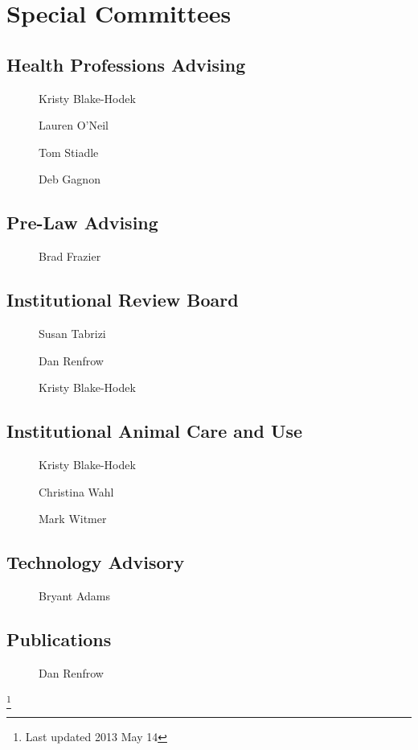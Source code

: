\documentclass[10pt, twocolumn]{amsart}
\newcommand{\noteQualification}[1]{}
\begin{document}
\section*{Special Committees}
\subsection*{Health Professions Advising} 
\begin{description}
\item[] Kristy Blake-Hodek
\item[] Lauren O'Neil
\item[] Tom Stiadle
\item[] Deb Gagnon
\end{description}

\subsection*{Pre-Law Advising} 
\begin{description}
\item[] Brad Frazier
\end{description}

\subsection*{Institutional Review Board} 
\begin{description}
\item[] Susan Tabrizi
\item[] Dan Renfrow
\item[] Kristy Blake-Hodek
\end{description}

\subsection*{Institutional Animal Care and Use} 
\begin{description}
\item[] Kristy Blake-Hodek \noteQualification{vertebrate animal care and responsibility certification}
\item[] Christina Wahl
\item[] Mark Witmer
\end{description}

\subsection*{Technology Advisory} 
\begin{description}
\item[] Bryant Adams
\end{description}

\subsection*{Publications} 
\begin{description}
\item[] Dan Renfrow
\end{description}





\vfill
\footnote{Last updated 2013 May 14}
\end{document}
